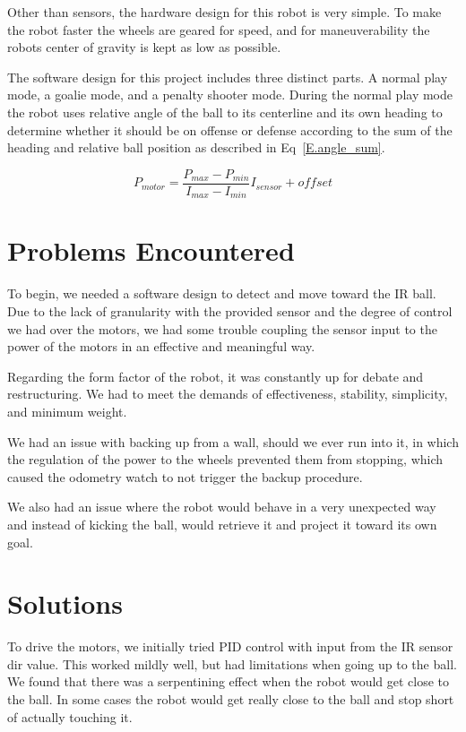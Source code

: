 \documentclass[journal]{../IEEEtran}
\begin{document}
Other than sensors, the hardware design for this robot is very simple. To make the robot faster the wheels are geared for speed, and for maneuverability the robots center of gravity is kept as low as possible.

The software design for this project includes three distinct parts. A normal play mode, a goalie mode, and a penalty shooter mode. During the normal play mode the robot uses relative angle of the ball to its centerline and its own heading to determine whether it should be on offense or defense according to the sum of the heading and relative ball position as described in Eq~\ref{E.angle_sum}.

\begin{equation}\label{E.motor_speed}
    P_{motor} = \frac{P_{max}-P_{min}}{I_{max}-I_{min}}I_{sensor} + offset
\end{equation}

\section{Problems Encountered}\label{S.problems}

To begin, we needed a software design to detect and move toward the IR ball. Due to the lack of granularity with the provided sensor and the degree of control we had over the motors, we had some trouble coupling the sensor input to the power of the motors in an effective and meaningful way.

Regarding the form factor of the robot, it was constantly up for debate and restructuring. We had to meet the demands of effectiveness, stability, simplicity, and minimum weight.

We had an issue with backing up from a wall, should we ever run into it, in which the regulation of the power to the wheels prevented them from stopping, which caused the odometry watch to not trigger the backup procedure.

We also had an issue where the robot would behave in a very unexpected way and instead of kicking the ball, would retrieve it and project it toward its own goal.

\section{Solutions}\label{S.solutions}

To drive the motors, we initially tried PID control with input from the IR sensor dir value. This worked mildly well, but had limitations when going up to the ball. We found that there was a serpentining effect when the robot would get close to the ball. In some cases the robot would get really close to the ball and stop short of actually touching it. 
\end{document}
